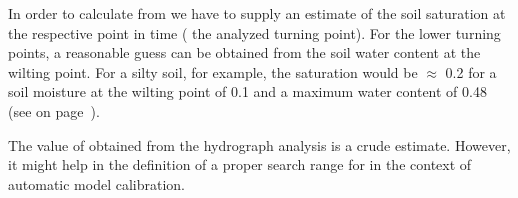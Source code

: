 In order to calculate \facBase{} from  we have to supply an estimate of the soil saturation \relSat{} at the respective point in time (\ie{} the analyzed turning point). For the lower turning points, a reasonable guess can be obtained from the soil water content at the wilting point. For a silty soil, for example, the saturation \relSat{} would be $\approx$ 0.2 for a soil moisture at the wilting point of 0.1 and a maximum water content of 0.48 (see  on page~\pageref{tab:et:real:soilmoisture}).

The value of \facBase{} obtained from the hydrograph analysis is a crude estimate. However, it might help in the definition of a proper search range for \facBase{} in the context of automatic model calibration.
